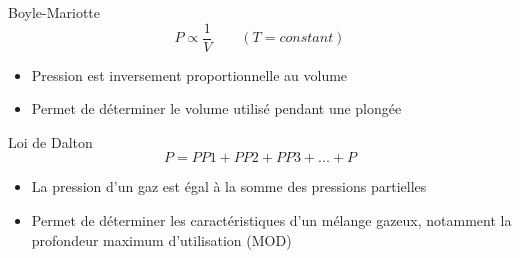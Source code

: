 \begin{frame}{Boyle-Mariotte}
	\[ \boxed{P \propto \frac{1}{V} \qquad (T=constant)} \]
	\begin{itemize}
		\item Pression est inversement proportionnelle au volume
		\item Permet de déterminer le volume utilisé pendant une plongée
	\end{itemize}
\end{frame}	

\begin{frame}{Loi de Dalton}
	\[\boxed{P = PP1 + PP2 + PP3 +...+P}\]
	\begin{itemize}
		\item La pression d'un gaz est égal à la somme des pressions partielles
		\item Permet de déterminer les caractéristiques d'un mélange gazeux, notamment la profondeur maximum d'utilisation (MOD)
	\end{itemize}
\end{frame}

